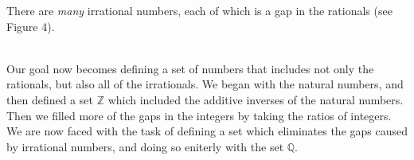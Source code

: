 \documentclass{article}
\newcommand{\Q}{\mathbb{Q}}
\newcommand{\Z}{\mathbb{Z}}
\theoremstyle{definition}
\begin{document}
	\noindent There are \textit{many} irrational numbers, each of which is a gap in the rationals (see Figure 4). 
	\begin{figure}[h]
		\centering
		\caption{}
	\end{figure}\\
	Our goal now becomes defining a set of numbers that includes not only the rationals, but also all of the irrationals. We began with the natural numbers, and then defined a set $ \Z $ which included the additive inverses of the natural numbers. Then we filled more of the gaps in the integers by taking the ratios of integers. We are now faced with the task of defining a set which eliminates the gaps caused by irrational numbers, and doing so eniterly with the set $ \Q $. 
\end{document}
